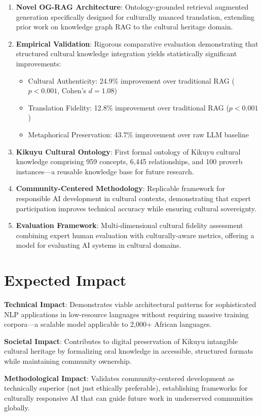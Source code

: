 \documentclass[11pt,a4paper]{article}
\begin{document}
\begin{enumerate}
    \item \textbf{Novel OG-RAG Architecture}: Ontology-grounded retrieval augmented generation specifically designed for culturally nuanced translation, extending prior work on knowledge graph RAG to the cultural heritage domain.
    
    \item \textbf{Empirical Validation}: Rigorous comparative evaluation demonstrating that structured cultural knowledge integration yields statistically significant improvements:
    \begin{itemize}
        \item Cultural Authenticity: 24.9\% improvement over traditional RAG ($p < 0.001$, Cohen's $d = 1.08$)
        \item Translation Fidelity: 12.8\% improvement over traditional RAG ($p < 0.001$)
        \item Metaphorical Preservation: 43.7\% improvement over raw LLM baseline
    \end{itemize}
    
    \item \textbf{Kikuyu Cultural Ontology}: First formal ontology of Kikuyu cultural knowledge comprising 959 concepts, 6,445 relationships, and 100 proverb instances---a reusable knowledge base for future research.
    
    \item \textbf{Community-Centered Methodology}: Replicable framework for responsible AI development in cultural contexts, demonstrating that expert participation improves technical accuracy while ensuring cultural sovereignty.
    
    \item \textbf{Evaluation Framework}: Multi-dimensional cultural fidelity assessment combining expert human evaluation with culturally-aware metrics, offering a model for evaluating AI systems in cultural domains.
\end{enumerate}

\vspace{10pt}

\section*{Expected Impact}

\textbf{Technical Impact}: Demonstrates viable architectural patterns for sophisticated NLP applications in low-resource languages without requiring massive training corpora---a scalable model applicable to 2,000+ African languages.

\textbf{Societal Impact}: Contributes to digital preservation of Kikuyu intangible cultural heritage by formalizing oral knowledge in accessible, structured formats while maintaining community ownership.

\textbf{Methodological Impact}: Validates community-centered development as technically superior (not just ethically preferable), establishing frameworks for culturally responsive AI that can guide future work in underserved communities globally.
\end{document}
